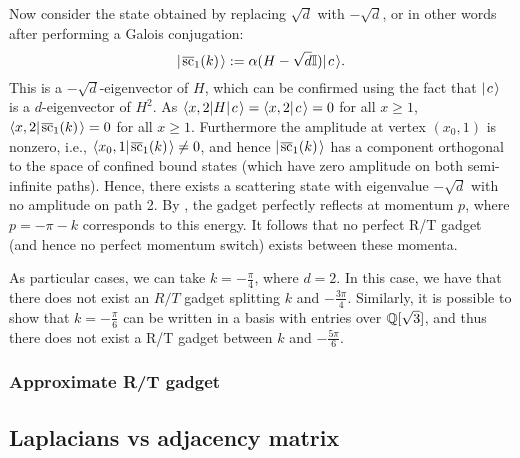\documentclass[../thesis-main/thesis-main]{subfiles}
\begin{document}
Now consider the state obtained by replacing $\sqrt{d}$ with $-\sqrt{d}$, or in other words after performing a Galois conjugation:
\begin{equation}
  |\mspace{2mu} \overline{\text{sc}}_1(k) \mspace{2mu} \rangle := \alpha (H-\sqrt{d}\mathbb{I}) |\mspace{2mu} c \mspace{2mu} \rangle.
\end{equation}
This is a $-\sqrt{d}$-eigenvector of $H$, which can be confirmed using the fact that $|\mspace{2mu} c \mspace{2mu} \rangle$ is a $d$-eigenvector of $H^2$. As $\langle{x,2} | H |\mspace{2mu} c \mspace{2mu} \rangle = \langle x,2 |\mspace{2mu} c \mspace{2mu} \rangle = 0$ for all $x\geq 1$, $\langle x,2 |\mspace{2mu} \overline{\text{sc}}_1(k) \mspace{2mu} \rangle = 0$ for all $x\geq 1$. Furthermore the amplitude at vertex $(x_0,1)$ is nonzero, i.e.,  $\langle x_0,1 |\mspace{2mu} \overline{\text{sc}}_1(k) \mspace{2mu} \rangle \neq 0$, and hence $|\mspace{2mu} \overline{\text{sc}}_1(k) \mspace{2mu} \rangle$ has a component orthogonal to the space of confined bound states (which have zero amplitude on both semi-infinite paths).  Hence, there exists a scattering state with eigenvalue $-\sqrt{d}$ with no amplitude on path 2. By , the gadget perfectly reflects at momentum $p$, where $p = -\pi - k$ corresponds to this energy.  It follows that no perfect R/T gadget (and hence no perfect momentum switch) exists between these momenta.

As particular cases, we can take $k = -\frac{\pi}{4}$, where $d = 2$.  In this case, we have that there does not exist an $R/T$ gadget splitting $k$ and $-\frac{3\pi}{4}$.   Similarly, it is possible to show that $k = -\frac{\pi}{6}$ can be written in a basis with entries over $\mathbb{Q}[\sqrt{3}]$, and thus there does not exist a R/T gadget between $k$ and $-\frac{5\pi}{6}$. 

\subsubsection{Approximate R/T gadget}



\subsection{Laplacians vs adjacency matrix}

\end{document}
